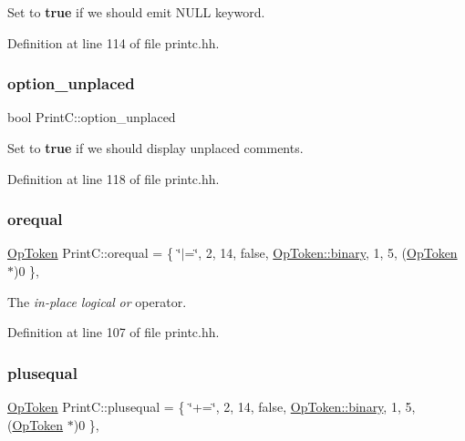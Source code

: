 Set to {\bfseries{true}} if we should emit N\+U\+LL keyword. 



Definition at line 114 of file printc.\+hh.

\mbox{\label{class_print_c_a8186b352ba2ddb4fa4623b23079e018d}} 
\subsubsection{\texorpdfstring{option\_unplaced}{option\_unplaced}}
{\footnotesize\ttfamily bool Print\+C\+::option\+\_\+unplaced\hspace{0.3cm}{\ttfamily [protected]}}



Set to {\bfseries{true}} if we should display unplaced comments. 



Definition at line 118 of file printc.\+hh.

\mbox{\label{class_print_c_a12b7e89b9bb491b2fdf7dbf82f02dd47}} 
\subsubsection{\texorpdfstring{orequal}{orequal}}
{\footnotesize\ttfamily \mbox{\hyperlink{class_op_token}{Op\+Token}} Print\+C\+::orequal = \{ \char`\"{}$\vert$=\char`\"{}, 2, 14, false, \mbox{\hyperlink{class_op_token_af41c7f108d5662ede7765c5a6c44eaffa3a2ec63522a9329a71ddbe8adc3e752d}{Op\+Token\+::binary}}, 1, 5, (\mbox{\hyperlink{class_op_token}{Op\+Token}} $\ast$)0 \}\hspace{0.3cm}{\ttfamily [static]}, {\ttfamily [protected]}}



The {\itshape in-\/place} {\itshape logical} {\itshape or} operator. 



Definition at line 107 of file printc.\+hh.

\mbox{\label{class_print_c_a2e154fb55cfe918759ac64fb0df9e44e}} 
\subsubsection{\texorpdfstring{plusequal}{plusequal}}
{\footnotesize\ttfamily \mbox{\hyperlink{class_op_token}{Op\+Token}} Print\+C\+::plusequal = \{ \char`\"{}+=\char`\"{}, 2, 14, false, \mbox{\hyperlink{class_op_token_af41c7f108d5662ede7765c5a6c44eaffa3a2ec63522a9329a71ddbe8adc3e752d}{Op\+Token\+::binary}}, 1, 5, (\mbox{\hyperlink{class_op_token}{Op\+Token}} $\ast$)0 \}\hspace{0.3cm}{\ttfamily [static]}, {\ttfamily [protected]}}



